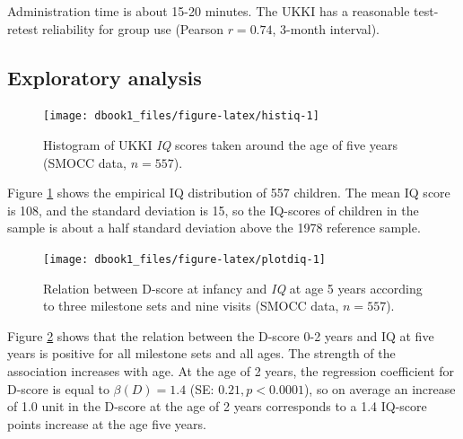\documentclass[
]{book}
\begin{document}
Administration time is about 15-20 minutes. The UKKI has a reasonable test-retest reliability for group use (Pearson \(r = 0.74\), 3-month interval).

\hypertarget{exploratory-analysis}{%
\subsection{Exploratory analysis}\label{exploratory-analysis}}

\begin{figure}

{\centering \texttt{[image: dbook1\_files/figure-latex/histiq-1]} 

}

\caption{Histogram of UKKI \emph{IQ} scores taken around the age of five years (SMOCC data, \(n = 557\)).}\label{fig:histiq}
\end{figure}



Figure \ref{fig:histiq} shows the empirical IQ distribution of 557 children. The mean IQ score is 108, and the standard deviation is 15, so the IQ-scores of children in the sample is about a half standard deviation above the 1978 reference sample.

\begin{figure}

{\centering \texttt{[image: dbook1\_files/figure-latex/plotdiq-1]} 

}

\caption{Relation between D-score at infancy and \emph{IQ} at age 5 years according to three milestone sets and nine visits (SMOCC data, \(n = 557\)).}\label{fig:plotdiq}
\end{figure}



Figure \ref{fig:plotdiq} shows that the relation between the D-score 0-2 years and IQ at five years is positive for all milestone sets and all ages. The strength of the association increases with age. At the age of 2 years, the regression coefficient for D-score is equal to \(\beta(D) = 1.4\) (SE: \(0.21, p < 0.0001\)), so on average an increase of 1.0 unit in the D-score at the age of 2 years corresponds to a 1.4 IQ-score points increase at the age five years.
\end{document}
